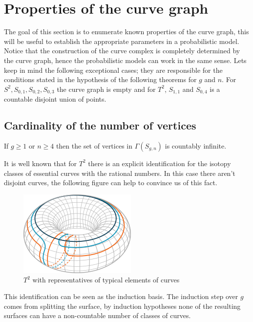 \section{Properties of the curve graph}
The goal of this section is to enumerate known properties of the curve graph, this will be useful to establish the appropriate parameters in a probabilistic model. Notice that the construction of the curve complex is completely determined by the curve graph, hence the probabilistic models can work in the same sense. Lets keep in mind the following exceptional cases; they are responsible for the conditions stated in the hypothesis of the following theorems for $g$ and $n$. For $ S^2, S_{0,1}, S _{0,2}, S_{0,3} $ the curve graph is empty and for  $ T^{2} $, $ S_{1,1}$ and $ S_{0,4}$ is a countable disjoint union of points.

\subsection{Cardinality of the number of vertices}
\begin{theorem}
If $g\geq 1$ or $n\geq 4$ then the set of vertices in $\Gamma(S_{g,n})$ is countably infinite.
\end{theorem}

It is well known that for $T^{2}$ there is an explicit identification for the isotopy classes of essential curves with the rational numbers. In this case there aren't disjoint curves, the following figure can help to convince us of this fact.
\vspace{0.5cm}
\begin{figure}[h!]
	\centering
	\includegraphics[scale=1]{Figures/Torus.png}
	\caption{$T^{2}$ with representatives of typical elements of curves}
\end{figure}

This identification can be seen as the induction basis. The induction step over $g$ comes from splitting the surface, by induction hypotheses none of the resulting surfaces can have a non-countable number of classes of curves.

